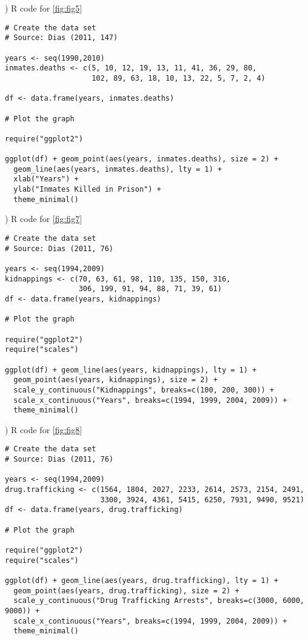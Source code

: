 ) R code for \autoref{fig:fig5}

{\footnotesize
\begin{verbatim}
# Create the data set
# Source: Dias (2011, 147)

years <- seq(1990,2010)
inmates.deaths <- c(5, 10, 12, 19, 13, 11, 41, 36, 29, 80,
                    102, 89, 63, 18, 10, 13, 22, 5, 7, 2, 4)

df <- data.frame(years, inmates.deaths)

# Plot the graph

require("ggplot2")

ggplot(df) + geom_point(aes(years, inmates.deaths), size = 2) + 
  geom_line(aes(years, inmates.deaths), lty = 1) +
  xlab("Years") +
  ylab("Inmates Killed in Prison") +
  theme_minimal()
\end{verbatim}
}

\newpage

) R code for \autoref{fig:fig7}

{\footnotesize
\begin{verbatim}
# Create the data set
# Source: Dias (2011, 76)

years <- seq(1994,2009)
kidnappings <- c(70, 63, 61, 98, 110, 135, 150, 316,
                 306, 199, 91, 94, 88, 71, 39, 61)
df <- data.frame(years, kidnappings)

# Plot the graph

require("ggplot2")
require("scales")

ggplot(df) + geom_line(aes(years, kidnappings), lty = 1) +
  geom_point(aes(years, kidnappings), size = 2) +
  scale_y_continuous("Kidnappings", breaks=c(100, 200, 300)) + 
  scale_x_continuous("Years", breaks=c(1994, 1999, 2004, 2009)) +
  theme_minimal()

\end{verbatim}
}

) R code for \autoref{fig:fig8}

{\footnotesize
\begin{verbatim}
# Create the data set
# Source: Dias (2011, 76)

years <- seq(1994,2009)
drug.trafficking <- c(1564, 1804, 2027, 2233, 2614, 2573, 2154, 2491,
                      3300, 3924, 4361, 5415, 6250, 7931, 9490, 9521)
df <- data.frame(years, drug.trafficking)

# Plot the graph

require("ggplot2")
require("scales")

ggplot(df) + geom_line(aes(years, drug.trafficking), lty = 1) + 
  geom_point(aes(years, drug.trafficking), size = 2) +  
  scale_y_continuous("Drug Trafficking Arrests", breaks=c(3000, 6000, 9000)) + 
  scale_x_continuous("Years", breaks=c(1994, 1999, 2004, 2009)) +
  theme_minimal()

\end{verbatim}
}
